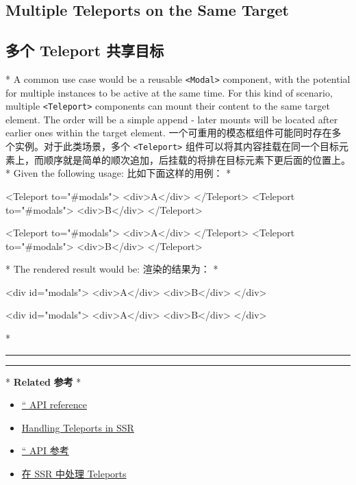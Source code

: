 \begin{paracol}{2}
\subsection{Multiple Teleports on the Same Target}
\switchcolumn
\subsection{多个 Teleport 共享目标}
\switchcolumn[0]*%
A common use case would be a reusable
\texttt{\textless{}Modal\textgreater{}} component, with the potential
for multiple instances to be active at the same time. For this kind of
scenario, multiple \texttt{\textless{}Teleport\textgreater{}} components
can mount their content to the same target element. The order will be a
simple append - later mounts will be located after earlier ones within
the target element.
\switchcolumn
一个可重用的模态框组件可能同时存在多个实例。对于此类场景，多个
\texttt{\textless{}Teleport\textgreater{}}
组件可以将其内容挂载在同一个目标元素上，而顺序就是简单的顺次追加，后挂载的将排在目标元素下更后面的位置上。
\switchcolumn[0]*%
Given the following usage:
\switchcolumn
比如下面这样的用例：
\switchcolumn[0]*%
\begin{codeHtml}
<Teleport to="#modals">
  <div>A</div>
</Teleport>
<Teleport to="#modals">
  <div>B</div>
</Teleport>
\end{codeHtml}
\switchcolumn
\begin{codeHtml}
<Teleport to="#modals">
  <div>A</div>
</Teleport>
<Teleport to="#modals">
  <div>B</div>
</Teleport>
\end{codeHtml}
\switchcolumn[0]*%
The rendered result would be:
\switchcolumn
渲染的结果为：
\switchcolumn[0]*%
\begin{codeHtml}
<div id="modals">
  <div>A</div>
  <div>B</div>
</div>
\end{codeHtml}
\switchcolumn
\begin{codeHtml}
<div id="modals">
  <div>A</div>
  <div>B</div>
</div>
\end{codeHtml}
\switchcolumn[0]*%
\begin{center}\rule{0.5\linewidth}{0.5pt}\end{center}
\switchcolumn
\begin{center}\rule{0.5\linewidth}{0.5pt}\end{center}
\switchcolumn[0]*%
\textbf{Related}
\switchcolumn
\textbf{参考}
\switchcolumn[0]*%
\begin{itemize}
\item
  \href{https://vuejs.org/api/built-in-components.html\#teleport}{`` API
  reference}
\item
  \href{https://vuejs.org/guide/scaling-up/ssr.html\#teleports}{Handling
  Teleports in SSR}
\end{itemize}
\switchcolumn
\begin{itemize}
\item
  \href{https://cn.vuejs.org/api/built-in-components.html\#teleport}{``
  API 参考}
\item
  \href{https://cn.vuejs.org/guide/scaling-up/ssr.html\#teleports}{在
  SSR 中处理 Teleports}
\end{itemize}
\end{paracol}
 